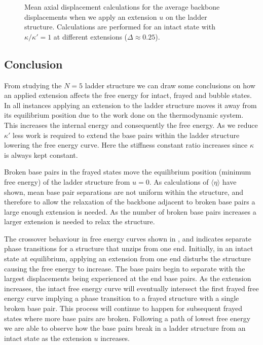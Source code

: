 \begin{figure}[H]
\begin{tabular}{cc}
\end{tabular}
\caption{Mean axial displacement calculations for the average backbone displacements when we apply an extension $u$ on the ladder structure. Calculations are performed for an intact state with $\kappa/\kappa'=1$ at different extensions ($\Delta \approx 0.25$).}
\label{fig:dna_mxd_xy} 
\end{figure}

\subsection{Conclusion}

From studying the $N=5$ ladder structure we can draw some conclusions on how an applied extension affects the free energy for intact, frayed and bubble states. In all instances applying an extension to the ladder structure moves it away from its equilibrium position due to the work done on the thermodynamic system. This increases the internal energy and consequently the free energy. As we reduce $\kappa'$ less work is required to extend the base pairs within the ladder structure lowering the free energy curve. Here the stiffness constant ratio increases since $\kappa$ is always kept constant.

Broken base pairs in the frayed states move the equilibrium position (minimum free energy) of the ladder structure from $u=0$. As calculations of $\langle \eta \rangle$ have shown, mean base pair separations are not uniform within the structure, and therefore to allow the relaxation of the backbone adjacent to broken base pairs a large enough extension is needed. As the number of broken base pairs increases a larger extension is needed to relax the structure.

The crossover behaviour in free energy curves shown in ,  and  indicates separate phase transitions for a structure that unzips from one end. Initially, in an intact state at equilibrium, applying an extension from one end disturbs the structure causing the free energy to increase. The base pairs begin to separate with the largest displacements being experienced at the end base pairs. As the extension increases, the intact free energy curve will eventually intersect the first frayed free energy curve implying a phase transition to a frayed structure with a single broken base pair. This process will continue to happen for subsequent frayed states where more base pairs are broken. Following a path of lowest free energy we are able to observe how the base pairs break in a ladder structure from an intact state as the extension $u$ increases. 

